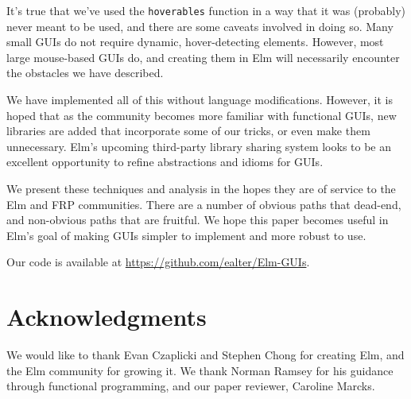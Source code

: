 \documentclass{article}
\begin{document}
It's true that we've used the \texttt{hoverables} function in a way that
it was (probably) never meant to be used, and there are some caveats
involved in doing so. Many small GUIs do not require dynamic,
hover-detecting elements. However, most large mouse-based GUIs do, and
creating them in Elm will necessarily encounter the obstacles we have
described.

We have implemented all of this without language modifications. However,
it is hoped that as the community becomes more familiar with functional
GUIs, new libraries are added that incorporate some of our tricks, or even
make them unnecessary. Elm's upcoming third-party library sharing system
looks to be an excellent opportunity to refine abstractions and idioms
for GUIs.

We present these techniques and analysis in the hopes they are of
service to the Elm and FRP communities. There are a number of obvious paths that
dead-end, and non-obvious paths that are fruitful. We hope this paper becomes
useful in Elm's goal of making GUIs simpler to implement and more robust
to use.

Our code is available at \url{https://github.com/ealter/Elm-GUIs}.

\section*{Acknowledgments}
We would like to thank Evan Czaplicki and Stephen Chong for creating
Elm, and the Elm community for growing it. We thank Norman Ramsey for
his guidance through functional programming, and our paper reviewer, Caroline
Marcks.



\end{document}
